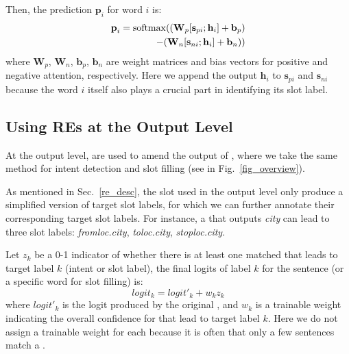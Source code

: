 Then, the prediction $\textbf{p}_i$ for word $i$ is:
\begin{equation}
\begin{split}
\textbf{p}_i = \operatorname{softmax}((\textbf{W}_p [\textbf{s}_{pi}; \textbf{h}_i] + \textbf{b}_p) \\- (\textbf{W}_n [\textbf{s}_{ni}; \textbf{h}_i] + \textbf{b}_n))
\end{split}
\end{equation}
where $\textbf{W}_{p}$, $\textbf{W}_{n}$, $\textbf{b}_{p}$, $\textbf{b}_{n}$ are weight matrices and bias vectors for positive and negative attention, respectively. Here we append the \BLSTM output $\textbf{h}_i$ to $\textbf{s}_{pi}$ and $\textbf{s}_{ni}$ because the word $i$ itself also plays a crucial part in identifying its slot label.

\subsection{Using REs at the Output Level}
\label{fusion_with_output} At the output level, \REs are used to amend the output of \NNs, where we take the same method for intent
detection and slot filling (see  in Fig.~\ref{fig_overview}).


As mentioned in Sec.~\ref{re_desc}, the slot \REs used in the output level only produce a simplified version of target slot labels, for which
we can further
annotate their corresponding target slot labels.
For instance, a \RE that outputs \emph{city} can lead to three slot labels: \emph{fromloc.city}, \emph{toloc.city},
\emph{stoploc.city}.

Let $z_k$ be a 0-1 indicator of whether there is at least one matched \RE that leads to target label $k$ (intent or slot label), the final logits
of label $k$ for the sentence (or a specific word for slot filling) is:
\begin{equation}
logit_k = logit'_k + w_k z_k
\end{equation}
where $logit'_k$ is the logit produced by the original \NN, and $w_k$ is a trainable weight indicating the overall confidence for \REs that
lead to target label $k$. Here we do not assign a trainable weight for each \RE because it is often that only a few sentences match a \RE.

